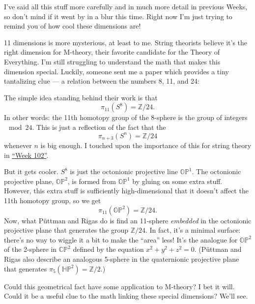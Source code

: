 \documentclass{article}
\def\tightlist{}
\renewcommand{\texttt}[1]{%
  \begingroup
  \ttfamily
  \begingroup\lccode`~=`/\lowercase{\endgroup\def~}{/\discretionary{}{}{}}%
  \begingroup\lccode`~=`[\lowercase{\endgroup\def~}{[\discretionary{}{}{}}%
  \begingroup\lccode`~=`.\lowercase{\endgroup\def~}{.\discretionary{}{}{}}%
  \catcode`/=\active\catcode`[=\active\catcode`.=\active
  \scantokens{#1\noexpand}%
  \endgroup
}
\begin{document}
I've said all this stuff more carefully and in much more detail in
previous Weeks, so don't mind if it went by in a blur this time. Right
now I'm just trying to remind you of how cool these dimensions are!

11 dimensions is more mysterious, at least to me. String theorists
believe it's the right dimension for M-theory, their favorite candidate
for the Theory of Everything. I'm still struggling to understand the
math that makes this dimension special. Luckily, someone sent me a paper
which provides a tiny tantalizing clue --- a relation between the
numbers 8, 11, and 24:


The simple idea standing behind their work is that
\[\pi_{11}(S^8) = \mathbb{Z}/24.\] In other words: the 11th homotopy
group of the 8-sphere is the group of integers \(\mod 24\). This is just
a reflection of the fact that the \[\pi_{n+3}(S^n) = \mathbb{Z}/24\]
whenever \(n\) is big enough. I touched upon the importance of this for
string theory in \protect\hyperlink{week102}{``Week 102''}.

But it gets cooler. \(S^8\) is just the octonionic projective line
\(\mathbb{OP}^1\). The octonionic projective plane, \(\mathbb{OP}^2\),
is formed from \(\mathbb{OP}^1\) by gluing on some extra stuff. However,
this extra stuff is sufficiently high-dimensional that it doesn't affect
the 11th homotopy group, so we get
\[\pi_{11}(\mathbb{OP}^2) = \mathbb{Z}/24.\] Now, what Püttman and
Rigas do is find an 11-sphere \emph{embedded} in the octonionic
projective plane that generates the group \(\mathbb{Z}/24\). In fact,
it's a minimal surface: there's no way to wiggle it a bit to make the
``area'' less! It's the analogue for \(\mathbb{OP}^2\) of the 2-sphere
in \(\mathbb{CP}^2\) defined by the equation \(x^2 + y^2 + z^2 = 0\).
(Püttman and Rigas also describe an analogous 5-sphere in the
quaternionic projective plane that generates
\(\pi_5(\mathbb{HP}^2) = \mathbb{Z}/2\).)

Could this geometrical fact have some application to M-theory? I bet it
will. Could it be a useful clue to the math linking these special
dimensions? We'll see.
\end{document}
